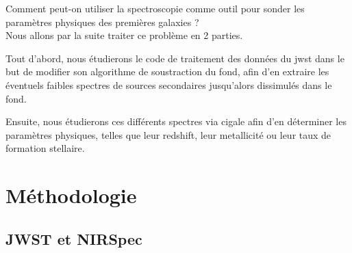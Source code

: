 \documentclass[11pt, a4paper]{article}
\begin{document}
Comment peut-on utiliser la spectroscopie comme outil pour sonder les paramètres physiques des premières galaxies ?\\

Nous allons par la suite traiter ce problème en 2 parties.

Tout d'abord, nous étudierons le code de traitement des données du \gls{jwst} dans le but de modifier son algorithme de soustraction du fond, afin d'en extraire les éventuels faibles spectres de sources secondaires jusqu'alors dissimulés dans le fond.

Ensuite, nous étudierons ces différents spectres via \gls{cigale} afin d'en déterminer les paramètres physiques, telles que leur redshift, leur metallicité ou leur taux de formation stellaire.

\section{Méthodologie}

\subsection{JWST et NIRSpec}
\end{document}
